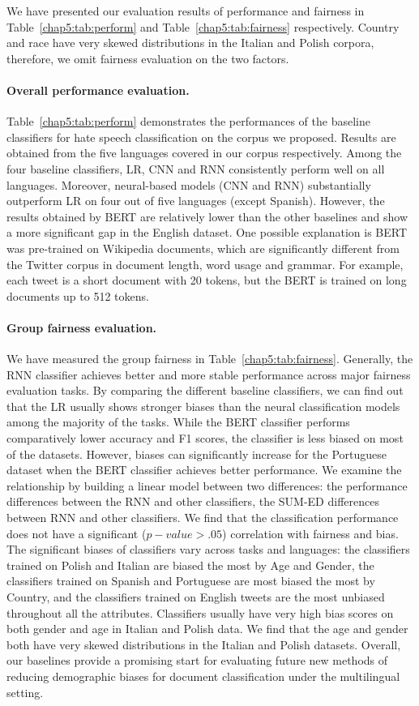 We have presented our evaluation results of performance and fairness in Table~\ref{chap5:tab:perform} and Table~\ref{chap5:tab:fairness} respectively.
Country and race have very skewed distributions in the Italian and Polish corpora, therefore, we omit fairness evaluation on the two factors.

\paragraph{Overall performance evaluation.}
Table~\ref{chap5:tab:perform} demonstrates the performances of the baseline classifiers for hate speech classification on the corpus we proposed. 
Results are obtained from the five languages covered in our corpus respectively.
Among the four baseline classifiers, LR, CNN and RNN consistently perform well on all languages.
Moreover, neural-based models (CNN and RNN) substantially outperform LR on four out of five languages (except Spanish).
However, the results obtained by BERT are relatively lower than the other baselines and show a more significant gap in the English dataset.
One possible explanation is BERT was pre-trained on Wikipedia documents, which are significantly different from the Twitter corpus in document length, word usage and grammar.
For example, each tweet is a short document with 20 tokens, but the BERT is trained on long documents up to 512 tokens.


\paragraph{Group fairness evaluation.}
We have measured the group fairness in Table~\ref{chap5:tab:fairness}. 
Generally, the RNN classifier achieves better and more stable performance across major fairness evaluation tasks.
By comparing the different baseline classifiers, we can find out that the LR usually shows stronger biases than the neural classification models among the majority of the tasks.
While the BERT classifier performs comparatively lower accuracy and F1 scores, the classifier is less biased on most of the datasets.
However, biases can significantly increase for the Portuguese dataset when the BERT classifier achieves better performance.
We examine the relationship by building a linear model between two differences: the performance differences between the RNN and other classifiers, the SUM-ED differences between RNN and other classifiers.
We find that the classification performance does not have a significant ($p-value > .05$) correlation with fairness and bias.
The significant biases of classifiers vary across tasks and languages: the classifiers trained on Polish and Italian are biased the most by Age and Gender, the classifiers trained on Spanish and Portuguese are most biased the most by Country, and the classifiers trained on English tweets are the most unbiased throughout all the attributes.
Classifiers usually have very high bias scores on both gender and age in Italian and Polish data.
We find that the age and gender both have very skewed distributions in the Italian and Polish datasets. 
Overall, our baselines provide a promising start for evaluating future new methods of reducing demographic biases for document classification under the multilingual setting.


